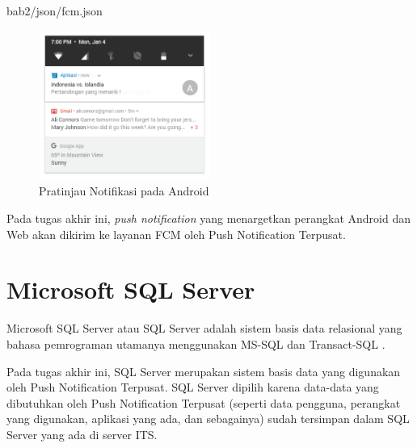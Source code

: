  {bab2/json/fcm.json}
\begin{figure}[H]
	\centering\includegraphics[width=0.5\textwidth]{bab2/img/fcm.png}
	\caption{Pratinjau Notifikasi pada Android}
	\label{img:contoh-hasil-fcm}
\end{figure}
\par Pada tugas akhir ini, \textit{push notification} yang menargetkan perangkat Android dan Web akan dikirim ke layanan FCM oleh Push Notification Terpusat.

\section{Microsoft SQL Server}
\par Microsoft SQL Server atau SQL Server adalah sistem basis data relasional yang bahasa pemrograman utamanya menggunakan MS-SQL dan Transact-SQL \cite{sqlserver-thesis}.
\par Pada tugas akhir ini, SQL Server merupakan sistem basis data yang digunakan oleh Push Notification Terpusat. SQL Server dipilih karena data-data yang dibutuhkan oleh Push Notification Terpusat (seperti data pengguna, perangkat yang digunakan, aplikasi yang ada, dan sebagainya) sudah tersimpan dalam SQL Server yang ada di server ITS.

